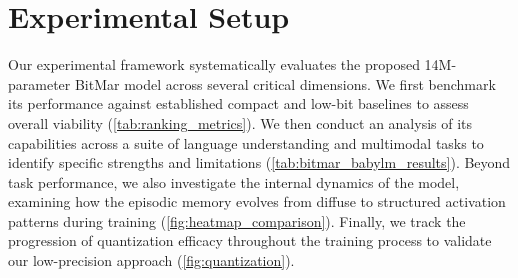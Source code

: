 


\section{Experimental Setup}
\label{sec:exp}

Our experimental framework systematically evaluates the proposed 14M-parameter BitMar model across several critical dimensions. We first benchmark its performance against established compact and low-bit baselines to assess overall viability (\autoref{tab:ranking_metrics}). We then conduct an analysis of its capabilities across a suite of language understanding and multimodal tasks to identify specific strengths and limitations (\autoref{tab:bitmar_babylm_results}). Beyond task performance, we also investigate the internal dynamics of the model, examining how the episodic memory evolves from diffuse to structured activation patterns during training (\autoref{fig:heatmap_comparison}). Finally, we track the progression of quantization efficacy throughout the training process to validate our low-precision approach (\autoref{fig:quantization}).

